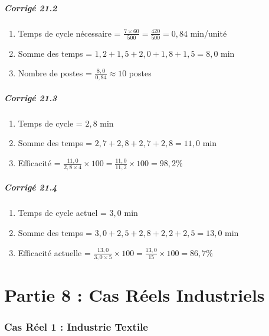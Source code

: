 \documentclass[a4paper,12pt]{article}
\begin{document}
\subsubsection*{Corrigé 21.2}

\begin{enumerate}
    \item Temps de cycle nécessaire = $\frac{7 \times 60}{500} = \frac{420}{500} = 0,84$ min/unité
    \item Somme des temps = $1,2+1,5+2,0+1,8+1,5 = 8,0$ min
    \item Nombre de postes = $\frac{8,0}{0,84} \approx 10$ postes
\end{enumerate}

\subsubsection*{Corrigé 21.3}

\begin{enumerate}
    \item Temps de cycle = $2,8$ min
    \item Somme des temps = $2,7+2,8+2,7+2,8 = 11,0$ min
    \item Efficacité = $\frac{11,0}{2,8 \times 4} \times 100 = \frac{11,0}{11,2} \times 100 = 98,2\%$
\end{enumerate}

\subsubsection*{Corrigé 21.4}

\begin{enumerate}
    \item Temps de cycle actuel = $3,0$ min
    \item Somme des temps = $3,0+2,5+2,8+2,2+2,5 = 13,0$ min
    \item Efficacité actuelle = $\frac{13,0}{3,0 \times 5} \times 100 = \frac{13,0}{15} \times 100 = 86,7\%$
\end{enumerate}

\part*{Partie 8 : Cas Réels Industriels}

\section{Cas Réel 1 : Industrie Textile}
\end{document}
